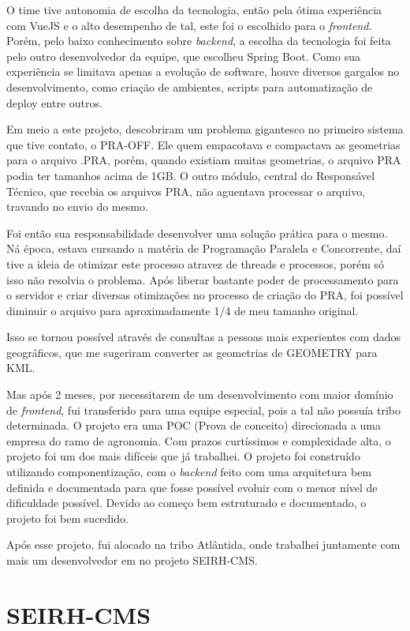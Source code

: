 O time tive autonomia de escolha da tecnologia, então pela ótima experiência com VueJS e o alto desempenho de tal, este foi o escolhido para o \textit{frontend}.
Porém, pelo baixo conhecimento sobre \textit{backend}, a escolha da tecnologia foi feita pelo outro desenvolvedor da equipe, que escolheu Spring Boot.
Como sua experiência se limitava apenas a evolução de software, houve diversos gargalos no desenvolvimento, como criação de ambientes, scripts para automatização de deploy entre outros.

Em meio a este projeto, descobriram um problema gigantesco no primeiro sistema que tive contato, o PRA-OFF. Ele quem empacotava e compactava as geometrias para o arquivo .PRA, porém, quando existiam muitas geometrias, o arquivo PRA podia ter tamanhos acima de 1GB.
O outro módulo, central do Responsável Técnico, que recebia os arquivos PRA, não aguentava processar o arquivo, travando no envio do mesmo.

Foi então sua responsabilidade desenvolver uma solução prática para o mesmo. Ná época, estava cursando a matéria de Programação Paralela e Concorrente, daí tive a ideia de otimizar este processo atravez de threads e processos, porém só isso não resolvia o problema.
Após liberar bastante poder de processamento para o servidor e criar diversas otimizações no processo de criação do PRA, foi possível diminuir o arquivo para aproximadamente 1/4 de meu tamanho original.

Isso se tornou possível através de consultas a pessoas mais experientes com dados geográficos, que me sugeriram converter as geometrias de GEOMETRY para KML.

Mas após 2 meses, por necessitarem de um desenvolvimento com maior domínio de \textit{frontend}, fui transferido para uma equipe especial, pois a tal não possuía tribo determinada.
O projeto era uma POC (Prova de conceito) direcionada a uma empresa do ramo de agronomia. Com prazos curtíssimos e complexidade alta, o projeto foi um dos mais difíceis que já trabalhei.
O projeto foi construído utilizando componentização, com o \textit{backend} feito com uma arquitetura bem definida e documentada para que fosse possível evoluir com o menor nível de dificuldade possível. Devido ao começo bem estruturado e documentado, o projeto foi bem sucedido.

Após esse projeto, fui alocado na tribo Atlântida, onde trabalhei juntamente com mais um desenvolvedor em no projeto SEIRH-CMS.

\section{SEIRH-CMS}

